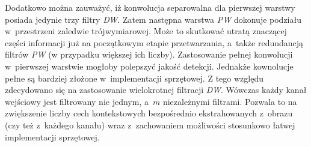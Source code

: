 Dodatkowo można zauważyć, iż konwolucja separowalna dla pierwszej warstwy posiada jedynie trzy filtry \emph{DW}.
Zatem następna warstwa \emph{PW} dokonuje podziału w~przestrzeni zaledwie trójwymiarowej. 
Może to skutkować utratą znaczącej części informacji już na początkowym etapie przetwarzania, a~także redundancją filtrów \emph{PW} (w przypadku większej ich liczby).
Zastosowanie pełnej konwolucji w~pierwszej warstwie mogłoby polepszyć jakość detekcji.
Jednakże kownolucje pełne są bardziej złożone w~implementacji sprzętowej. 
Z tego względu zdecydowano się na zastosowanie wielokrotnej filtracji \emph{DW}.
Wówczas każdy kanał wejściowy jest filtrowany nie jednym, a~$m$ niezależnymi filtrami.
Pozwala to na zwiększenie liczby cech kontekstowych bezpośrednio ekstrahowanych z~obrazu (czy też z~każdego kanału) wraz z~zachowaniem możliwości stosunkowo łatwej implementacji sprzętowej.

